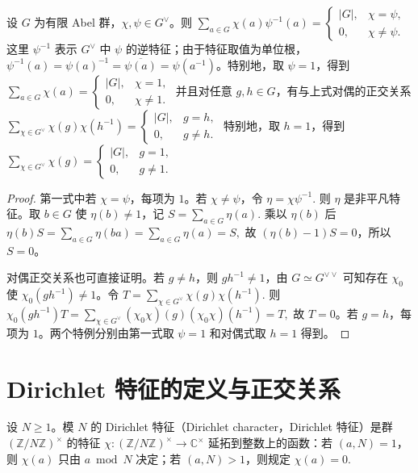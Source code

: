 \documentclass[oneside]{AJbook}
\newcommand{\Z}{\mathbb Z}
\newcommand{\C}{\mathbb C}
\newcommand{\U}[1]{(\Z/#1\Z)^\times}
\begin{document}
\begin{theorem}[特征的正交关系]
设 $G$ 为有限 Abel 群，$\chi,\psi\in G^\vee$。则
\(
  \sum_{a\in G}\chi(a)\psi^{-1}(a)
  =
  \begin{cases}
    |G|,& \chi=\psi,\\
    0,& \chi\ne\psi.
  \end{cases}
\)
这里 \(\psi^{-1}\) 表示 \(G^\vee\) 中 \(\psi\) 的逆特征；由于特征取值为单位根，\(\psi^{-1}(a)=\psi(a)^{-1}=\overline{\psi(a)}=\psi(a^{-1})\)。特别地，取 \(\psi=1\)，得到
\(
  \sum_{a\in G}\chi(a)
  =
  \begin{cases}
    |G|,& \chi=1,\\
    0,& \chi\ne1.
  \end{cases}
\)
并且对任意 \(g,h\in G\)，有与上式对偶的正交关系
\(
  \sum_{\chi\in G^\vee}\chi(g)\chi(h^{-1})
  =
  \begin{cases}
    |G|,& g=h,\\
    0,& g\ne h.
  \end{cases}
\)
特别地，取 \(h=1\)，得到
\(
  \sum_{\chi\in G^\vee}\chi(g)
  =
  \begin{cases}
    |G|,& g=1,\\
    0,& g\ne1.
  \end{cases}
\)
\end{theorem}

\begin{proof}
第一式中若 $\chi=\psi$，每项为 $1$。若 $\chi\ne\psi$，令
\(
  \eta=\chi\psi^{-1}.
\)
则 $\eta$ 是非平凡特征。取 $b\in G$ 使 $\eta(b)\ne1$，记
\(
  S=\sum_{a\in G}\eta(a).
\)
乘以 $\eta(b)$ 后
\(
  \eta(b)S=\sum_{a\in G}\eta(ba)=\sum_{a\in G}\eta(a)=S,
\)
故 $(\eta(b)-1)S=0$，所以 $S=0$。

对偶正交关系也可直接证明。若 \(g\ne h\)，则 \(gh^{-1}\ne1\)，由
$G\simeq G^{\vee\vee}$ 可知存在 $\chi_0$ 使 $\chi_0(gh^{-1})\ne1$。令
\(
  T=\sum_{\chi\in G^\vee}\chi(g)\chi(h^{-1}).
\)
则
\(
  \chi_0(gh^{-1})T
  =
  \sum_{\chi\in G^\vee}(\chi_0\chi)(g)(\chi_0\chi)(h^{-1})
  =
  T,
\)
故 $T=0$。若 \(g=h\)，每项为 \(1\)。两个特例分别由第一式取 \(\psi=1\) 和对偶式取 \(h=1\) 得到。
\end{proof}

\section{Dirichlet 特征的定义与正交关系}

\begin{definition}
设 $N\ge1$。模 $N$ 的 Dirichlet 特征（Dirichlet character，Dirichlet 特征）是群
\(
  \U N
\)
的特征
\(
  \chi:\U N\longrightarrow \C^\times
\)
延拓到整数上的函数：若 $(a,N)=1$，则 $\chi(a)$ 只由 $a\bmod N$ 决定；若 $(a,N)>1$，则规定
\(
  \chi(a)=0.
\)
\end{definition}
\end{document}

